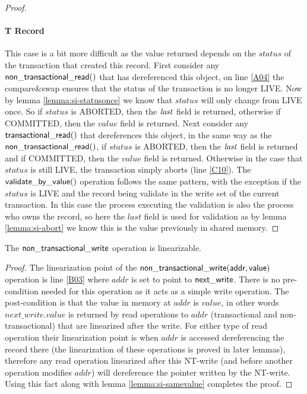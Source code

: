 \begin{proof}
\paragraph{T Record} This case is a bit more difficult as the value returned depends on the $\mathit{status}$ of the transaction
that created this record.
First consider any $\sf{non\_transactional\_read}()$ that has dereferenced this object, on line \ref{A04} the compare\&swap ensures that the status of the transaction is
no longer LIVE.
Now by lemma \ref{lemma:si-statusonce} we know that $\mathit{status}$ will only change from LIVE once.
So if $\mathit{status}$ is ABORTED, then the $\ms{last}$ field is returned, otherwise if COMMITTED, then the $\mathit{value}$ field is returned.
Next consider any $\sf{transactional\_read}()$ that dereferences this object, in the same way as the $\sf{non\_transactional\_read}()$, if
$\mathit{status}$ is ABORTED, then the $\ms{last}$ field is returned and if COMMITTED, then the $\mathit{value}$ field is returned.
Otherwise in the case that $\mathit{status}$ is still LIVE, the transaction simply aborts (line \ref{C10}).
The $\sf{validate\_by\_value}()$ operation follows the same pattern, with the exception if the $\mathit{status}$ is LIVE and
the record being validate in the write set of the current transaction.
In this case the process executing the validation is also the process who owns the record,
so here the $\mathit{last}$ field is used for validation as by lemma \ref{lemma:si-abort} we know this is the value previously
in shared memory.
\end{proof}




\begin{lemma}
\label{lemma:si-ntwrite}
The $\sf{non\_transactional\_write}$ operation is linearizable.
\end{lemma}
\begin{proof}
The linearization point of the $\sf{non\_transactional\_write}(addr,value)$ operation
is line \ref{B03} where $\mathit{addr}$ is set to point to $\sf{next\_write}$.
There is no pre-condition needed for this operation as it acts as a simple write operation.
The post-condition is that the value in memory at $\mathit{addr}$ is $\mathit{value}$, in other words $\mathit{next\_write.value}$ is returned by 
read operations to $\mathit{addr}$ (transactional and non-transactional) that are linearized after the write.
For either type of read operation their linearization point is when $\mathit{addr}$ is accessed dereferencing the record there
(the linearization of these operations is proved in later lemmas),
therefore any read operation linearized after this NT-write (and before another operation modifies $\mathit{addr}$)
will dereference the pointer written by the NT-write.
Using this fact along with lemma \ref{lemma:si-samevalue} completes the proof.
\end{proof}


